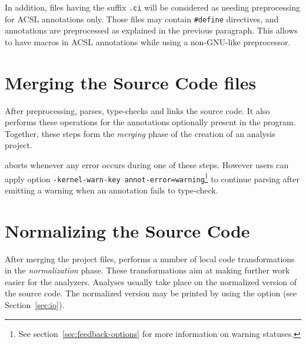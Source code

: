 In addition, files having the suffix \texttt{.ci} will be considered as needing
preprocessing for ACSL annotations only. Those files may contain
\texttt{\#define} directives, and annotations are preprocessed as explained in
the previous paragraph. This allows to have macros in ACSL annotations while
using a non-GNU-like preprocessor.

\section{Merging the Source Code files}

After preprocessing, \FramaC parses, type-checks and links the source
code.  It also performs these operations for the \acsl annotations
optionally present in the program. Together, these steps form the
\emph{merging} phase of the creation of an analysis project.

\FramaC aborts whenever any error occurs during one of these steps. However
users can apply option
\texttt{-kernel-warn-key annot-error=warning}\footnote{%
See section~\ref{sec:feedback-options} for more information on warning statuses.}
to continue parsing after emitting a warning when an \acsl annotation fails to type-check.

\section{Normalizing the Source Code}\label{sec:normalize}

After merging the project files, \FramaC performs
a number of local code transformations in the \emph{normalization} phase.
These transformations aim at making further work easier for the analyzers.
Analyses usually take place on the normalized version of the source code.
The normalized version may be printed by using
the option  (see Section~\ref{sec:io}).

